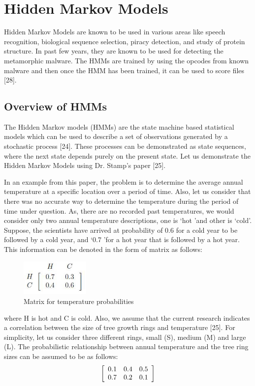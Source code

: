 \chapter{Hidden Markov Models}
Hidden Markov Models are known to be used in various areas like speech recognition, biological sequence selection, piracy detection, and study of protein structure. In past few years, they are known to be used for detecting the metamorphic malware. The HMMs are trained by using the opcodes from known malware and then once the HMM has been trained, it can be used to score files [28].

\section{Overview of HMMs}
The Hidden Markov models (HMMs) are the state machine based statistical models which can be used to describe a set of observations generated by a stochastic process [24]. These processes can be demonstrated as state sequences, where the next state depends purely on the present state. Let us demonstrate the Hidden Markov Models using Dr. Stamp\rq s paper [25].

In an example from this paper, the problem is to determine the average annual temperature at a specific location over a period of time. Also, let us consider that there was no accurate way to determine the temperature during the period of time under question. As, there are no recorded past temperatures, we would consider only two annual temperature descriptions, one is \lq hot \rq and other is \lq cold\rq. Suppose, the scientists have arrived at probability of 0.6 for a cold year to be followed by a cold year, and \lq 0.7 \rq for a hot year that is followed by a hot year. This information can be denoted in the form of matrix as follows:

\begin{figure}[htb]
\centering
\includegraphics[width=0.3\textwidth]{images/mat.jpg}
\caption{Matrix for temperature probabilities} 
\label{fig:Matrix for temperature probabilities}
\end{figure}
\break

where H is hot and C is cold.
Also, we assume that the current research indicates a correlation between the size of tree growth rings and temperature [25]. For simplicity, let us consider three different rings, small (S), medium (M) and large (L). The probabilistic relationship between annual temperature and the tree ring sizes can be assumed to be as follows:
$$ \left[
  \begin{array}{c c c}
     0.1& 0.4& 0.5\\
     0.7& 0.2& 0.1
  \end{array} \right]
$$

